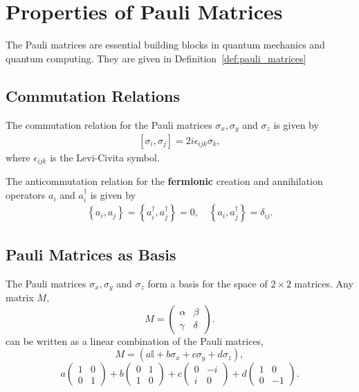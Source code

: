 \appendix

\chapter{Properties of Pauli Matrices}
\label{app:pauli_properties}

The Pauli matrices are essential building blocks in quantum mechanics and quantum computing. They are given in Definition~\ref{def:pauli_matrices}
\section{Commutation Relations}
\label{appsec:commutation_relations}

The commutation relation for the Pauli matrices $ \sigma_x, \sigma_y$ and $ \sigma_z$ is given by
\begin{align}
  \label{eq:pauli_commutation_relation}
  \left[ \sigma_i, \sigma_j \right] = 2 i \epsilon_{ijk} \sigma_k,
\end{align}
where $ \epsilon_{ijk}$ is the Levi-Civita symbol. 

The anticommutation relation for the \textbf{fermionic} creation and annihilation operators $ a_i$ and $ a_i^\dagger$ is given by
\begin{align}
  \label{eq:creation_annihilation_commutation_relation}
  \left\{ a_i, a_j \right\} = \left\{ a_i^\dagger, a_j^\dagger \right\} = 0, \quad \left\{ a_i, a_j^\dagger \right\} = \delta_{ij}.
\end{align}

\section{Pauli Matrices as Basis}
\label{appsec:pauli_basis}
The Pauli matrices $ \sigma_x, \sigma_y $ and $ \sigma_z $ form a basis for the space of $ 2 \times 2$ matrices. Any matrix $M$,
\[ M = \begin{pmatrix} 
\alpha & \beta \\ \gamma & \delta \
\end{pmatrix}. \] 
can be written as a linear combination of the Pauli matrices,
\[ M = \left( a \mathbb{I} + b \sigma_x + c \sigma_y + d \sigma_z \right), \]
\[ a 
	\begin{pmatrix} 1 & 0 \\ 0 & 1 \end{pmatrix} + b \begin{pmatrix} 0 & 1 \\1 & 0 \end{pmatrix} + c \begin{pmatrix} 0 & -i \\ i & 0 \end{pmatrix} + d \begin{pmatrix} 1 & 0 \\ 0 & -1 \end{pmatrix}.  \] 

